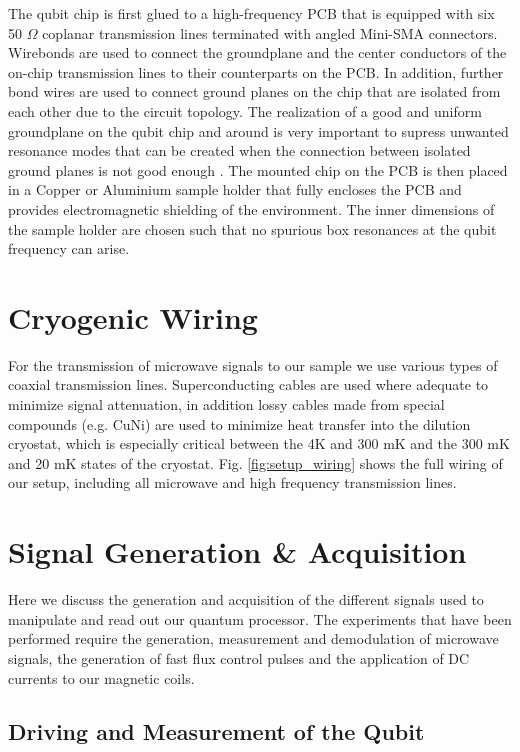 The qubit chip is first glued to a high-frequency PCB that is equipped with six 50 $\Omega$ coplanar transmission lines terminated with angled Mini-SMA connectors. Wirebonds are used to connect the groundplane and the center conductors of the on-chip transmission lines to their counterparts on the PCB. In addition, further bond wires are used to connect ground planes on the chip that are isolated from each other due to the circuit topology. The realization of a good and uniform groundplane on the qubit chip and around is very important to supress unwanted resonance modes that can be created when the connection between isolated ground planes is not good enough . The mounted chip on the PCB is then placed in a Copper or Aluminium sample holder that fully encloses the PCB and provides electromagnetic shielding of the environment. The inner dimensions of the sample holder are chosen such that no spurious box resonances at the qubit frequency can arise.

\section{Cryogenic Wiring}

For the transmission of microwave signals to our sample we use various types of coaxial transmission lines. Superconducting cables are used where adequate to minimize signal attenuation, in addition lossy cables made from special compounds (e.g. CuNi) are used to minimize heat transfer into the dilution cryostat, which is especially critical between the 4K and 300 mK and the 300 mK and 20 mK states of the cryostat. Fig. \ref{fig:setup_wiring} shows the full wiring of our setup, including all microwave and high frequency transmission lines.

\section{Signal Generation \& Acquisition}

Here we discuss the generation and acquisition of the different signals used to manipulate and read out our quantum processor. The experiments that have been performed require the generation, measurement and demodulation of microwave signals, the generation of fast flux control pulses and the application of DC currents to our magnetic coils.

\subsection{Driving and Measurement of the Qubit}

